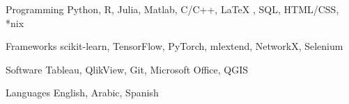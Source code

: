 


\begin{cvskills}
\cvskill
{Programming} %
{Python, R,  Julia, Matlab, C/C++, LaTeX , SQL, HTML/CSS, *nix} %

\cvskill
{Frameworks} %
{scikit-learn, TensorFlow, PyTorch, mlextend, NetworkX, Selenium} %



\cvskill
{Software} %
{Tableau, QlikView, Git, Microsoft Office, QGIS } %


\cvskill
{Languages} %
{English, Arabic, Spanish} %


\end{cvskills}
